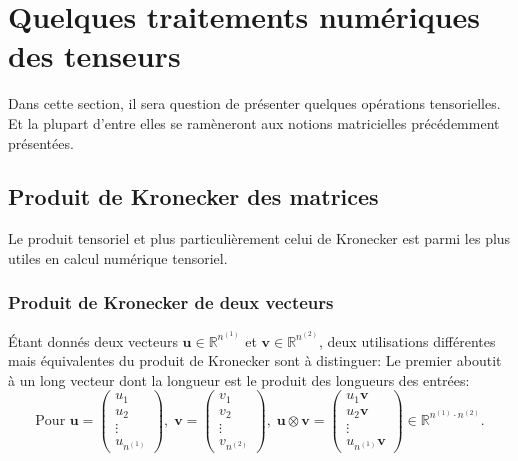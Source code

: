 \documentclass[11pt,a4paper,oneside]{book}
\def\R{\mathbb R}
\newcommand{\mbf}[1]{\mathbf{#1}}
\begin{document}
\section{Quelques traitements numériques des tenseurs}
\label{sec:2.2traitements}
Dans cette section, il sera question de présenter quelques opérations tensorielles. Et la plupart d'entre elles se ramèneront aux notions matricielles précédemment présentées.
\subsection{Produit de Kronecker des matrices}
Le produit tensoriel et plus particulièrement celui de Kronecker est parmi les plus utiles en calcul numérique tensoriel.
\subsubsection{Produit de Kronecker de deux  vecteurs} Étant donnés deux vecteurs $ \mbf{u}\in \R^{n^{(1)}} $ et $ \mbf{v}\in\R^{n^{(2)}} $, deux utilisations différentes mais équivalentes du produit de Kronecker sont à distinguer: Le premier aboutit à un long vecteur dont la longueur est le produit des longueurs des entrées:
\begin{equation}\label{(2.1)}
\text{Pour } \mbf{u}=\begin{pmatrix}
u_{1}\\
u_{2}\\
\vdots\\
u_{n^{(1)}}
\end{pmatrix},\;\mbf{v}=\begin{pmatrix}
v_{1}\\
v_{2}\\
\vdots\\
v_{n^{(2)}}
\end{pmatrix},\; \mbf{u}\otimes \mbf{v}=\begin{pmatrix}
u_{1}\mbf{v}\\
u_{2}\mbf{v}\\
\vdots\\
u_{n^{(1)}}\mbf{v}
\end{pmatrix}\in \R^{n^{(1)}\cdot n^{(2)}}.
\end{equation}
\end{document}
